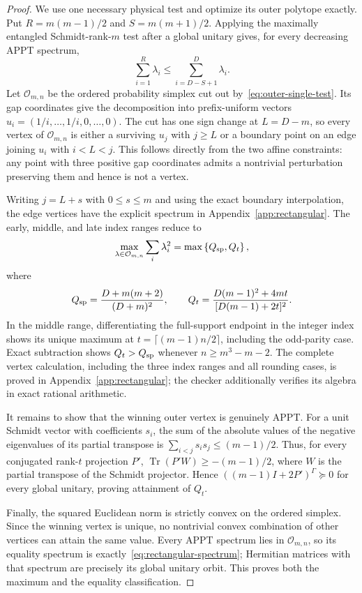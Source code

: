 \documentclass[11pt]{article}
\theoremstyle{remark}\newtheorem{remark}[theorem]{Remark}
\begin{document}
\begin{proof}
We use one necessary physical test and optimize its outer polytope exactly. Put $R=m(m-1)/2$ and $S=m(m+1)/2$. Applying the maximally entangled Schmidt-rank-$m$ test after a global unitary gives, for every decreasing APPT spectrum,
\begin{equation}\label{eq:outer-single-test}
 \sum_{i=1}^{R}\lambda_i\leq\sum_{i=D-S+1}^{D}\lambda_i.
\end{equation}
Let $\mathcal O_{m,n}$ be the ordered probability simplex cut out by~\eqref{eq:outer-single-test}. Its gap coordinates give the decomposition into prefix-uniform vectors $u_i=(1/i,\ldots,1/i,0,\ldots,0)$. The cut has one sign change at $L=D-m$, so every vertex of $\mathcal O_{m,n}$ is either a surviving $u_j$ with $j\geq L$ or a boundary point on an edge joining $u_i$ with $i<L<j$. This follows directly from the two affine constraints: any point with three positive gap coordinates admits a nontrivial perturbation preserving them and hence is not a vertex.

Writing $j=L+s$ with $0\leq s\leq m$ and using the exact boundary interpolation, the edge vertices have the explicit spectrum in Appendix~\ref{app:rectangular}. The early, middle, and late index ranges reduce to
\[
 \max_{\lambda\in\mathcal O_{m,n}}\sum_i\lambda_i^2
 =\max\left\{Q_{\rm sp},Q_t\right\},
\]
where
\[
 Q_{\rm sp}=\frac{D+m(m+2)}{(D+m)^2},\qquad
 Q_t=\frac{D(m-1)^2+4mt}{[D(m-1)+2t]^2}.
\]
In the middle range, differentiating the full-support endpoint in the integer index shows its unique maximum at $t=\lceil(m-1)n/2\rceil$, including the odd-parity case. Exact subtraction shows $Q_t>Q_{\rm sp}$ whenever $n\geq m^3-m-2$. The complete vertex calculation, including the three index ranges and all rounding cases, is proved in Appendix~\ref{app:rectangular}; the checker additionally verifies its algebra in exact rational arithmetic.

It remains to show that the winning outer vertex is genuinely APPT. For a unit Schmidt vector with coefficients $s_i$, the sum of the absolute values of the negative eigenvalues of its partial transpose is $\sum_{i<j}s_i s_j\leq(m-1)/2$. Thus, for every conjugated rank-$t$ projection $P'$, $\operatorname{Tr}(P'W)\geq-(m-1)/2$, where $W$ is the partial transpose of the Schmidt projector. Hence $((m-1)I+2P')^\Gamma\succeq0$ for every global unitary, proving attainment of $Q_t$.

Finally, the squared Euclidean norm is strictly convex on the ordered simplex. Since the winning vertex is unique, no nontrivial convex combination of other vertices can attain the same value. Every APPT spectrum lies in $\mathcal O_{m,n}$, so its equality spectrum is exactly~\eqref{eq:rectangular-spectrum}; Hermitian matrices with that spectrum are precisely its global unitary orbit. This proves both the maximum and the equality classification.
\end{proof}
\end{document}
